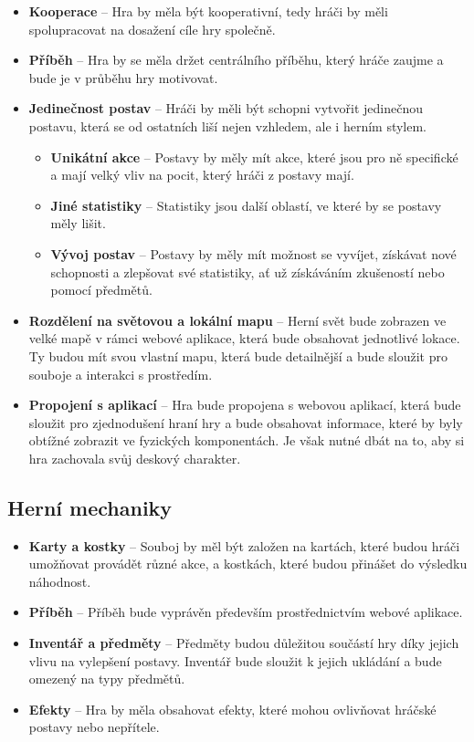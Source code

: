\begin{itemize}
    \item \textbf{Kooperace} -- 
        Hra by měla být kooperativní, tedy hráči by měli spolupracovat na dosažení cíle hry společně.
    \item \textbf{Příběh} -- 
        Hra by se měla držet centrálního příběhu, který hráče zaujme a bude je v průběhu hry motivovat.
    \item \textbf{Jedinečnost postav} -- 
        Hráči by měli být schopni vytvořit jedinečnou postavu, která se od ostatních liší nejen vzhledem, ale i herním stylem.

    \begin{itemize}
        \item \textbf{Unikátní akce} -- 
            Postavy by měly mít akce, které jsou pro ně specifické a mají velký vliv na pocit, který hráči z postavy mají.
        \item \textbf{Jiné statistiky} -- 
            Statistiky jsou další oblastí, ve které by se postavy měly lišit.
        \item \textbf{Vývoj postav} -- 
            Postavy by měly mít možnost se vyvíjet, získávat nové schopnosti a zlepšovat své statistiky, ať už získáváním zkušeností nebo pomocí předmětů.
    \end{itemize}

    \item \textbf{Rozdělení na světovou a lokální mapu} -- 
        Herní svět bude zobrazen ve velké mapě v rámci webové aplikace, která bude obsahovat jednotlivé lokace. Ty budou mít svou vlastní mapu, která bude detailnější a bude sloužit pro souboje a interakci s prostředím.
    \item \textbf{Propojení s aplikací} -- 
        Hra bude propojena s webovou aplikací, která bude sloužit pro zjednodušení hraní hry a bude obsahovat informace, které by byly obtížné zobrazit ve fyzických komponentách. Je však nutné dbát na to, aby si hra zachovala svůj deskový charakter.
\end{itemize}

\subsection{Herní mechaniky}
\label{subsec:req_mechanics}

\begin{itemize}
    \item \textbf{Karty a kostky} -- 
        Souboj by měl být založen na kartách, které budou hráči umožňovat provádět různé akce, a kostkách, které budou přinášet do výsledku náhodnost.
    \item \textbf{Příběh} -- 
        Příběh bude vyprávěn především prostřednictvím webové aplikace.
    \item \textbf{Inventář a předměty} -- 
        Předměty budou důležitou součástí hry díky jejich vlivu na vylepšení postavy. Inventář bude sloužit k jejich ukládání a bude omezený na typy předmětů.
    \item \textbf{Efekty} -- 
        Hra by měla obsahovat efekty, které mohou ovlivňovat hráčské postavy nebo nepřítele.
\end{itemize}

